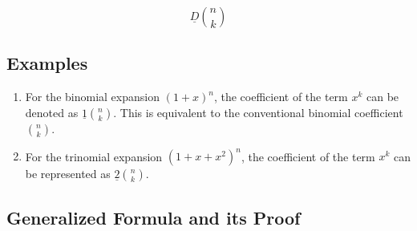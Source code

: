 \documentclass{article}
\theoremstyle{plain}
\begin{document}
\[ \underline{D}\binom{n}{k} \]

\subsection*{Examples}
\begin{enumerate}
\item For the binomial expansion \( (1+x)^n \), the coefficient of the term \( x^k \) can be denoted as \( \underline{1}\binom{n}{k} \). This is equivalent to the conventional binomial coefficient \( \binom{n}{k} \).

\item For the trinomial expansion \( (1+x+x^2)^n \), the coefficient of the term \( x^k \) can be represented as \(\underline{2}\binom{n}{k}\).
\end{enumerate}

\subsection{Generalized Formula and its Proof}
\end{document}
